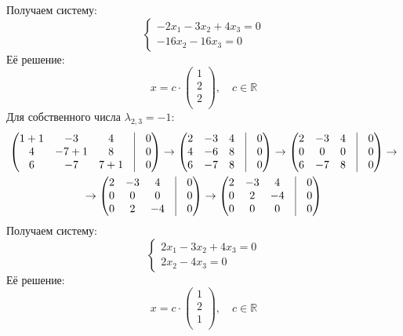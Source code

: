\documentclass[a4paper, 12pt]{article}
\begin{document}
Получаем систему:
\[
\begin{cases}
        -2x_1 -3x_2 + 4x_3 = 0 \\ 
        -16x_2 - 16x_3 = 0 
\end{cases} 
\]
Её решение:
\[
x = c \cdot
\begin{pmatrix}
    1 \\
    2 \\
    2 \\
\end{pmatrix}, \quad c \in \mathbb{R}
\]
Для собственного числа $\lambda_{2,3} = -1$:
\begin{gather*}
    \begin{pmatrix}
        1 +1 & -3 & 4 & \vrule & 0 \\ 
        4 & -7 +1 & 8 & \vrule & 0 \\ 
        6 & -7 & 7 + 1 & \vrule & 0
    \end{pmatrix} \rightarrow
    \begin{pmatrix}
        2 & -3 & 4 & \vrule & 0 \\ 
        4 & -6 & 8 & \vrule & 0 \\ 
        6 & -7 & 8 & \vrule & 0
    \end{pmatrix} \rightarrow
    \begin{pmatrix}
        2 & -3 & 4 & \vrule & 0 \\
        0 & 0 & 0 & \vrule & 0 \\
        6 & -7 & 8 & \vrule & 0
    \end{pmatrix} \rightarrow \\ \rightarrow  
    \begin{pmatrix}
        2 & -3 & 4 & \vrule & 0 \\
        0 & 0 & 0 & \vrule & 0 \\
        0 & 2 & -4 & \vrule & 0
    \end{pmatrix} \rightarrow
    \begin{pmatrix}
        2 & -3 & 4 & \vrule & 0 \\
        0 & 2 & -4 & \vrule & 0 \\
        0 & 0 & 0 & \vrule & 0
    \end{pmatrix}
\end{gather*}
Получаем систему:
\[
\begin{cases}
        2x_1 -3x_2 + 4x_3 = 0 \\ 
        2x_2 - 4x_3 = 0 
\end{cases} 
\]
Её решение:
\[
x = c \cdot
\begin{pmatrix}
    1 \\
    2 \\
    1 \\
\end{pmatrix}, \quad c \in \mathbb{R}
\]
\end{document}
